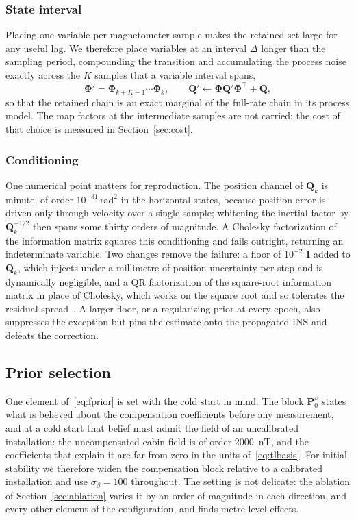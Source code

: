 \subsubsection{State interval}
Placing one variable per magnetometer sample makes the retained set large for
any useful lag. We therefore place variables at an interval $\Delta$ longer than
the sampling period, compounding the transition and accumulating the process
noise exactly across the $K$ samples that a variable interval spans,
\begin{equation}
\boldsymbol{\Phi}'=\boldsymbol{\Phi}_{k+K-1}\cdots\boldsymbol{\Phi}_{k},
\qquad
\mathbf{Q}'\leftarrow\boldsymbol{\Phi}\mathbf{Q}'\boldsymbol{\Phi}^{\top}+\mathbf{Q},
\label{eq:compound}
\end{equation}
so that the retained chain is an exact marginal of the full-rate chain in its
process model. The map factors at the intermediate samples are not carried; the
cost of that choice is measured in Section~\ref{sec:cost}.

\subsubsection{Conditioning}
One numerical point matters for reproduction. The position channel of
$\mathbf{Q}_k$ is minute, of order $10^{-31}\,\mathrm{rad}^2$ in the horizontal
states, because position error is driven only through velocity over a single
sample; whitening the inertial factor by $\mathbf{Q}_k^{-1/2}$ then spans some
thirty orders of magnitude. A Cholesky factorization of the information matrix
squares this conditioning and fails outright, returning an indeterminate
variable. Two changes remove the failure: a floor of $10^{-20}\mathbf{I}$ added
to $\mathbf{Q}_k$, which injects under a millimetre of position uncertainty per
step and is dynamically negligible, and a QR factorization of the square-root
information matrix in place of Cholesky, which works on the square root and so
tolerates the residual spread~\cite{dellaert2006}. A larger floor, or a
regularizing prior at every epoch, also suppresses the exception but pins the
estimate onto the propagated INS and defeats the correction.

\subsection{Prior selection}\label{sec:coldprior}
One element of~\eqref{eq:fprior} is set with the cold start in mind. The block
$\mathbf{P}_0^{\beta}$ states what is believed about the compensation
coefficients before any measurement, and at a cold start that belief must admit
the field of an uncalibrated installation: the uncompensated cabin field is of
order \SI{2000}{\nano\tesla}, and the coefficients that explain it are far from
zero in the units of~\eqref{eq:tlbasis}. For initial stability we therefore
widen the compensation block relative to a calibrated installation and use
$\sigma_{\beta}=100$ throughout. The setting is not delicate: the ablation of
Section~\ref{sec:ablation} varies it by an order of magnitude in each direction,
and every other element of the configuration, and finds metre-level effects.
